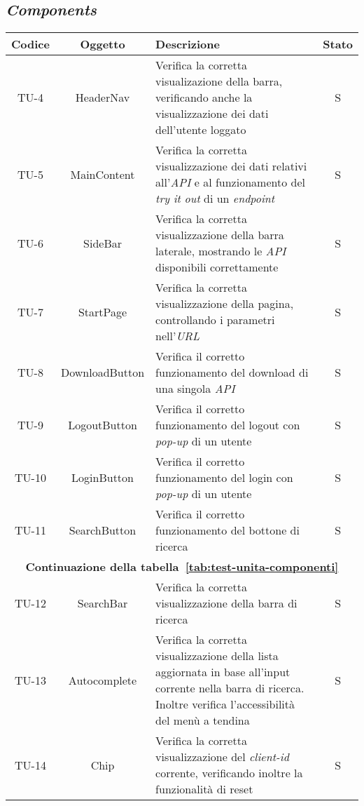 \subsection*{\emph{Components}}

\begin{center}
  \label{tab:test-unita-componenti}
  \begin{longtable}{|c|c|p{}|c|}
  \hline
  \textbf{Codice} & \textbf{Oggetto} & \textbf{Descrizione} & \textbf{Stato}\\
  \hline
  TU-4 &HeaderNav &Verifica la corretta visualizazione della barra, verificando anche la visualizzazione dei dati dell'utente loggato  &S \\
  \hline
  TU-5 &MainContent &Verifica la corretta visualizzazione dei dati relativi all'\textit{API} e al funzionamento del \textit{try it out} di un \textit{endpoint} &S \\
  \hline
  TU-6 &SideBar &Verifica la corretta visualizzazione della barra laterale, mostrando le \textit{API} disponibili correttamente &S \\
  \hline
  TU-7 &StartPage &Verifica la corretta visualizzazione della pagina, controllando i parametri nell'\textit{URL} &S \\
  \hline
  TU-8 &DownloadButton &Verifica il corretto funzionamento del download di una singola \textit{API} &S \\
  \hline
  TU-9 &LogoutButton &Verifica il corretto funzionamento del logout con \textit{pop-up} di un utente &S \\
  \hline
  TU-10 &LoginButton &Verifica il corretto funzionamento del login con \textit{pop-up} di un utente &S \\
  \hline
  TU-11 &SearchButton &Verifica il corretto funzionamento del bottone di ricerca &S \\
  \hline
  \multicolumn{4}{|c|}{\textbf{Continuazione della tabella~\ref{tab:test-unita-componenti}}} \\
  \hline
  TU-12 &SearchBar &Verifica la corretta visualizzazione della barra di ricerca &S \\
  \hline
  TU-13 &Autocomplete &Verifica la corretta visualizzazione della lista aggiornata in base all'input corrente nella barra di ricerca. Inoltre verifica l'accessibilità del menù a tendina  &S \\
  \hline
  TU-14 &Chip &Verifica la corretta visualizzazione del \textit{client-id} corrente, verificando inoltre la funzionalità di reset &S \\

\end{longtable}
\end{center}
